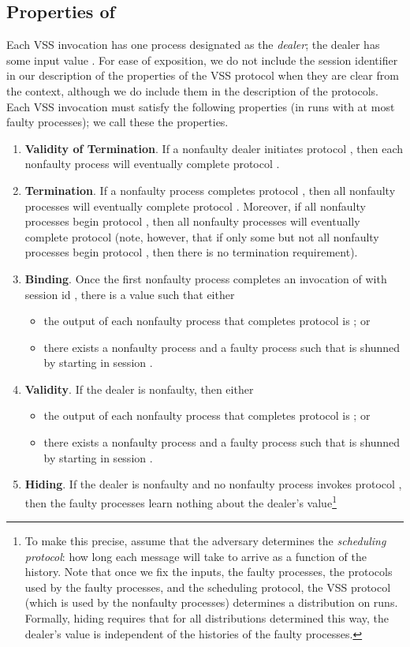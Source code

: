 \documentclass{sig-alternate}
\def\beginsmall#1{\vspace{-\parskip}\begin{#1}\itemsep-\parskip}
\def\endsmall#1{\end{#1}\vspace{-\parskip}}
\newcommand{\davss}{{\text{SVSS}}\xspace}
\begin{document}
\subsection{Properties of \davss}
Each VSS invocation has one process  designated as the
\emph{dealer}; the
dealer has some input value .
For ease of exposition, we do not include the session identifier in our
description of the properties of the VSS protocol when they are clear
from the context, although we do include them in the description of the
protocols.
Each VSS invocation must satisfy the following properties (in runs with at
most  faulty processes); we call these the
\emph{\davss} properties.
\beginsmall{enumerate}
\item \textbf{Validity of Termination}. If a nonfaulty dealer initiates
    protocol , then each nonfaulty process will eventually
    complete protocol .

\item \textbf{Termination}. If a nonfaulty process completes protocol
    , then all nonfaulty processes will eventually complete
    protocol .
Moreover, if all nonfaulty processes begin protocol ,
    then all nonfaulty processes will eventually complete
    protocol 
(note, however, that if only some but not all nonfaulty processes begin
protocol , then there is no termination requirement).
\item \textbf{Binding}. Once the first nonfaulty process completes an invocation of
 with session id ,
there is a value  such that either
 \beginsmall{itemize}
 \item the output of each nonfaulty process that completes protocol
 is ; or
 \item  there exists a nonfaulty process  and a faulty process  such that  is shunned by  starting in session .
\endsmall{itemize}

\item  \textbf{Validity}. If the dealer is nonfaulty, then either
     \beginsmall{itemize}
         \item  the output of each nonfaulty process that completes protocol  is ; or
         \item  there exists a nonfaulty process  and a faulty process  such that  is shunned by  starting in session .
    \endsmall{itemize}

\item \textbf{Hiding}.  If the dealer is nonfaulty and no
    nonfaulty process invokes protocol , then the
    faulty processes learn nothing about the dealer's value\footnote{To make this precise, assume that the adversary
    determines the \emph{scheduling protocol}:
    how long each message will take to arrive as a function
    of the history.  Note that once we fix the inputs, the faulty processes,
    the protocols used by the faulty processes, and the scheduling
    protocol, the VSS protocol (which is used by the nonfaulty processes)
    determines a distribution on runs.  Formally, hiding requires that for
    all distributions
    determined this way, the dealer's value is independent of the
    histories of the faulty processes.}
\endsmall{enumerate}
\end{document}
